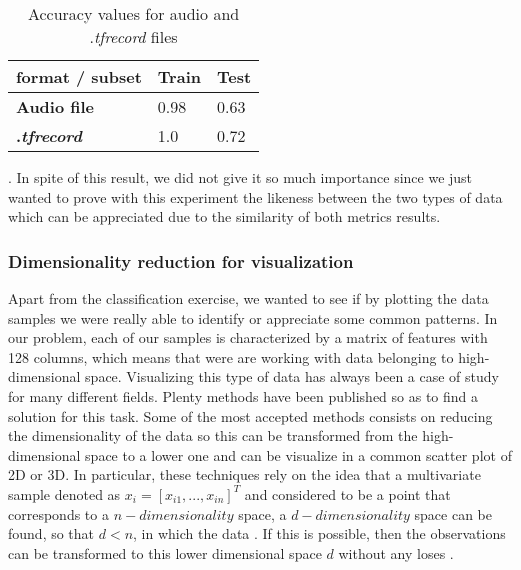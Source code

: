 	\begin{table}[h]
	\begin{center}
		\centering
		\begin{tabular}{|| m{7em} | m{7em} | m{7em} ||}
			\hline
			format / subset & \textbf{Train} & \textbf{Test} \\
			\hline\hline
			\textbf{Audio file} & 0.98 & 0.63 \\
			\hline
			\textbf{.\textit{tfrecord}} & 1.0 & 0.72 \\
			\hline
		\end{tabular}
	\end{center}
	\caption{Accuracy values for audio and .\textit{tfrecord} files}
	\label{table:5}
	\end{table}

	. In spite of this result, we did not give it so much importance since we just wanted to prove with this experiment the likeness between the two types of data which can be appreciated due to the similarity of both metrics results.
	
\subsubsection{Dimensionality reduction for visualization}
	
	Apart from the classification exercise, we wanted to see if by plotting the data samples we were really able to identify or appreciate some common patterns. In our problem, each of our samples is characterized by a matrix of features with 128 columns, which means that were are working with data belonging to high-dimensional space. Visualizing this type of data has always been a case of study for many different fields. Plenty methods have been published so as to find a solution for this task. Some of the most accepted methods consists on reducing the dimensionality of the data so this can be transformed from the high-dimensional space to a lower one and can be visualize in a common scatter plot of 2D or 3D. In particular, these techniques rely on the idea that a multivariate sample denoted as $x_i = [x_{i1},..., x_{in}]^T$ and considered to be a point that corresponds to a $n-dimensionality$ space, a $d-dimensionality$ space can be found, so that $d < n$, in which the data . If this is possible, then the observations can be transformed to this lower dimensional space $d$ without any loses \cite{Kaski2011}. 
	
